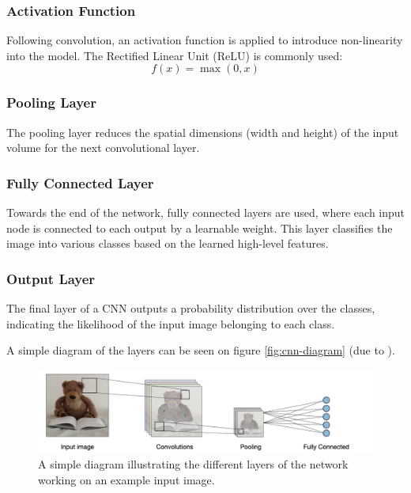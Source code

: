 \subsubsection{Activation Function}
Following convolution, an activation function is applied to introduce non-linearity into the model. The Rectified Linear Unit (ReLU) is commonly used:
\[f(x) = \max(0, x)\]

\subsubsection{Pooling Layer}
The pooling layer reduces the spatial dimensions (width and height) of the input volume for the next convolutional layer.

\subsubsection{Fully Connected Layer}
Towards the end of the network, fully connected layers are used, where each input node is connected to each output by a learnable weight. This layer classifies the image into various classes based on the learned high-level features.

\subsubsection{Output Layer}
The final layer of a CNN
outputs a probability distribution over the classes, indicating the likelihood of the input image belonging to each class.

A simple diagram of the layers can be seen on figure \autoref{fig:cnn-diagram} (due to \cite{cnn_diagram_source}).

\begin{figure}[h!]
	\centering
	\includegraphics[width=0.5\linewidth]{"pictures/architecture-cnn-en.jpeg"}
	\caption{A simple diagram illustrating the different layers of the network working on an example input image.}
	\label{fig:cnn-diagram}

\end{figure}

